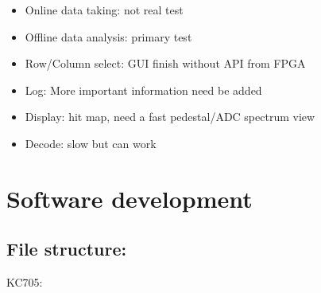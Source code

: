\documentclass{article}
\begin{document}
    \begin{itemize}
     
        \item Online data taking: not real test
        \item Offline data analysis: primary test
        \item Row/Column select: GUI finish without API from FPGA
        \item Log: More important information need be added
        \item Display: hit map, need a fast pedestal/ADC spectrum view
        \item Decode: slow but can work
         
    \end{itemize}




\section{Software development}

    \subsection{ File structure:}
    
    KC705:
            
\end{document}
